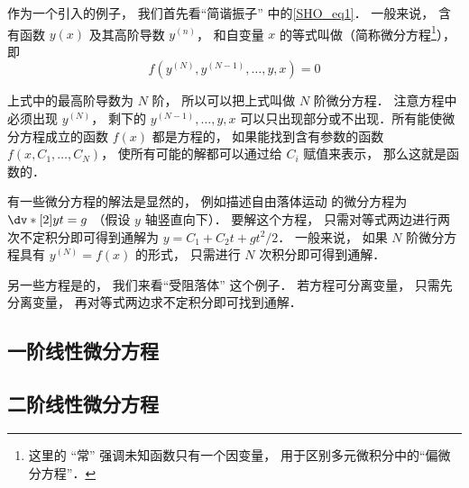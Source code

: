 

作为一个引入的例子， 我们首先看“简谐振子” 中的\autoref{SHO_eq1}． 一般来说， 含有函数 $y(x)$ 及其高阶导数 $y^{(n)}$， 和自变量 $x$ 的等式叫做（简称微分方程\footnote{这里的 “常” 强调未知函数只有一个因变量， 用于区别多元微积分中的“偏微分方程”．}）， 即
\begin{equation}
f(y^{(N)}, y^{(N-1)}, \dots, y, x) = 0
\end{equation}

上式中的最高阶导数为 $N$ 阶， 所以可以把上式叫做 $N$ 阶微分方程． 注意方程中必须出现 $y^{(N)}$， 剩下的 $y^{(N-1)}, \dots, y, x$ 可以只出现部分或不出现．所有能使微分方程成立的函数 $f(x)$ 都是方程的， 如果能找到含有参数的函数 $f(x,C_1, \dots , C_N)$， 使所有可能的解都可以通过给 $C_i$ 赋值来表示， 那么这就是函数的．

有一些微分方程的解法是显然的， 例如描述自由落体运动 的微分方程为 $\dv*[2]{y}{t} = g$ （假设 $y$ 轴竖直向下）． 要解这个方程， 只需对等式两边进行两次不定积分即可得到通解为 $y = C_1 + C_2 t + gt^2/2$． 一般来说， 如果 $N$ 阶微分方程具有 $y^{(N)} = f(x)$ 的形式， 只需进行 $N$ 次积分即可得到通解．

另一些方程是的， 我们来看“受阻落体” 这个例子． 若方程可分离变量， 只需先分离变量， 再对等式两边求不定积分即可找到通解．

\subsection{一阶线性微分方程}

\subsection{二阶线性微分方程}